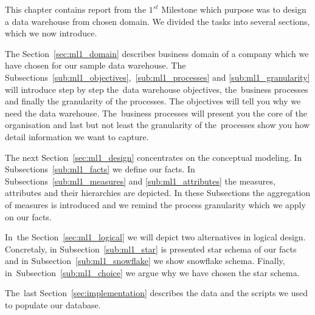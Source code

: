 This chapter contains report from the $1^{st}$  Milestone which purpose was to design a data warehouse from chosen domain. We divided the tasks into several sections, which we now introduce.

The Section~\ref{sec:ml1_domain} describes business domain of a company which we have chosen for our sample data warehouse. The Subsections~\ref{sub:ml1_objectives},~\ref{sub:ml1_processes} and \ref{sub:ml1_granularity} will introduce  step by step the~data warehouse objectives, the~business processes and finally the granularity of the processes. The objectives will tell you why we need the data warehouse. The~business processes will present you the core of the organisation and last but not least the granularity of the~processes show you how detail information we want to capture.

The next Section~\ref{sec:ml1_design} concentrates on the conceptual modeling. In Subsections~\ref{sub:ml1_facts} we define our facts. In Subsections~\ref{sub:ml1_measures} and \ref{sub:ml1_attributes} the measures, attributes and their hierarchies are depicted. In these Subsections the aggregation of measures is introduced and we remind the process granularity which we apply on our facts.

In~the Section~\ref{sec:ml1_logical} we will depict two alternatives in logical design. Concretaly, in Subsection~\ref{sub:ml1_star} is presented star schema of our facts and in Subsection~\ref{sub:ml1_snowflake} we show snowflake schema. Finally, in~Subsection~\ref{sub:ml1_choice} we argue why we have chosen the star schema. 

The~last Section~\ref{sec:implementation} describes the data and the scripts we used to populate our database. 
